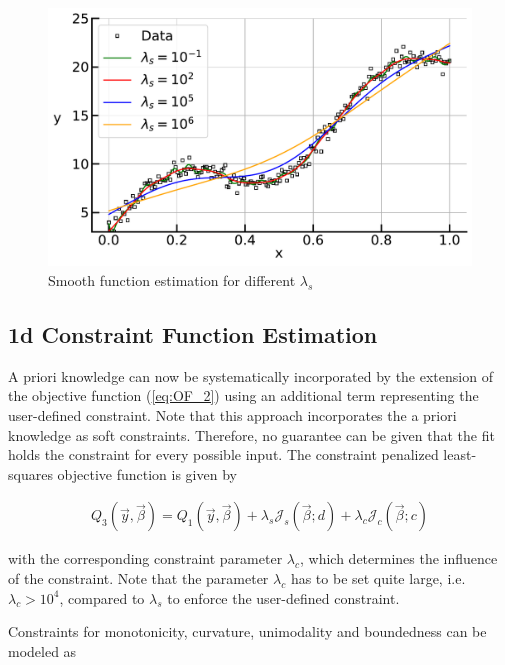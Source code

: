 \documentclass[10pt,a4paper]{article}
\begin{document}
	\begin{figure}[H]
		\centering
		\includegraphics[width=\linewidth]{../thesisplots/p_splines.pdf}
		\caption{Smooth function estimation for different $\lambda_s$}
		\label{fig:pspline}
	\end{figure}

	\subsection{1d Constraint Function Estimation}
	
	A priori knowledge can now be systematically incorporated by the extension of the objective function (\ref{eq:OF_2}) using an additional term representing the user-defined constraint. Note that this approach incorporates the a priori knowledge as soft constraints. Therefore, no guarantee can be given that the fit holds the constraint for every possible input. The constraint penalized least-squares objective function is given by
	
	\begin{align}\label{eq:OF_3}
		Q_3(\vec{y}, \vec{\beta}) = Q_1(\vec{y}, \vec{\beta}) + \lambda_s \mathcal{J}_s(\vec{\beta}; d) + \lambda_c \mathcal{J}_c(\vec{\beta}; c)
	\end{align}
	
	with the corresponding constraint parameter $\lambda_c$, which determines the influence of the constraint. Note that the parameter $\lambda_c$ has to be set quite large, i.e. $\lambda_c > 10^4$, compared to $\lambda_s$ to enforce the user-defined constraint. 
	
	Constraints for monotonicity, curvature, unimodality and boundedness can be modeled as 
	
\end{document}
